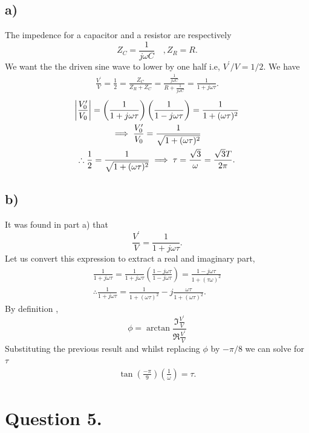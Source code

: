 \documentclass[
	12pt,
	]{article}
\newcommand{\p}{\prime}
\theoremstyle{definition}
\theoremstyle{definition}
\theoremstyle{definition}
\theoremstyle{definition}
\theoremstyle{definition}
\theoremstyle{example}
\theoremstyle{note}
\theoremstyle{remark}
\theoremstyle{example}
\begin{document}
			\subsection*{a) }
				The impedence for a capacitor and a resistor are respectively 
				$$ Z_{C} = \frac{1}{j\omega C} \quad, Z_{R}= R.$$
				We want the the driven sine wave to lower by one half i.e, $V^{\p} / V = 1/2.$ We have
				\begin{align*}
					\frac{V^{\p}}{V} = \frac{1}{2} = \frac{Z_{C}}{Z_{R} + Z_{C}} = \frac{\frac{1}{j\omega C}}{R + \frac{1}{j \omega C}} = \frac{1}{1+j\omega\tau}.
				\end{align*}
				\begin{gather*}
					\abs{\frac{V_{0}^{\p}}{V_{0}}} = \left(\frac{1}{1+j\omega \tau} \right)\left(\frac{1}{1-j\omega \tau}\right)= \frac{1}{1+(\omega\tau)^{2}}\\
					\implies \frac{V_{0}^{\p}}{V_{0}} = \frac{1}{\sqrt{1+ (\omega\tau)^{2}}} \\
					\therefore \frac12 = \frac{1}{\sqrt{1+ (\omega\tau)^{2}}} \implies \tau = \frac{\sqrt{3}}{\omega} = \frac{\sqrt{3}T}{2\pi}.
				\end{gather*}
			\subsection*{b) }
				It was found in part a) that 
				$$ \frac{V^{\p}}{V} = \frac{1}{1+j\omega\tau}.$$
				Let us convert this expression to extract a real and imaginary part, 
				\begin{gather*}
					\frac{1}{1+j\omega\tau} = \frac{1}{1+j\omega\tau} \left(\frac{1-j\omega\tau}{1-j\omega\tau}\right)= \frac{1-j\omega\tau}{1+(\tau\omega)^{2}} \\
					\therefore 	\frac{1}{1+j\omega\tau} = \frac{1}{1+(\omega\tau)^{2}} -j \frac{\omega\tau}{1+(\omega\tau)^{2}}.
				\end{gather*}
				By definition , 
				$$ \phi = \arctan \frac{\Im{\frac{V^{\p}}{V}}}{\Re{\frac{V^{\p}}{V}}}$$
				Substituting the previous result and whilst replacing $\phi$ by $-\pi/8$ we can solve for $\tau$ 
				\begin{gather*}
					\tan\left(\frac{-\pi}{9}\right)\left(\frac{1}{\omega}\right) = \tau.
				\end{gather*}
		\section*{Question 5.}
\end{document}
